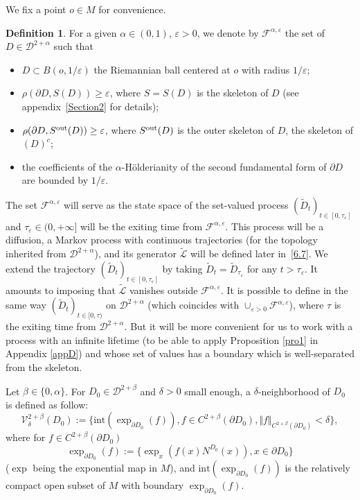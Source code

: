 \documentclass[JEP,XML,SOM,Unicode,NoFloatCountersInSection,published]{cedram}
\let\epsilon\varepsilon
\theoremstyle{plain}
\theoremstyle{definition}
\newtheorem{definition}[thm]{Definition}
\newcommand{\SD}{{\mathscr D}}
\newcommand{\SL}{{\mathscr L}}
\newcommand{\barD}{D}
\newcommand{\inte}{\mathrm{int}}
\let\a\alpha
\let\b\beta
\let\d\delta
\let\e\varepsilon
\let\pa\partial
\let\wi\widetilde
\let\iy\infty
\newcommand{\cD}{\mathcal{D}}
\newcommand{\cF}{\mathcal{F}}
\begin{document}
We fix a point $o\in M$ for convenience.
\begin{definition}
\label{D6.1}
For a given $\a\in(0,1)$, $\e>0$,
we denote by $\cF^{\alpha,\e}$ the set of $D\in \SD^{2+\a}$ such that
\begin{itemize}
\item $D\subset B(o,1/\e)$ the Riemannian ball centered at $o$ with radius $1/\e$;
\item $\rho(\partial D, S(D))\geq \e$,
where $S=S(D)$ is the skeleton of $D$ (see appendix~\ref{Section2} for details);
\item $\rho(\partial D, S^{\rm out}(D))\geq \e$,
where $S^{\rm out}(D)$ is the outer skeleton of $D$, \ie the skeleton of $(\barD )^c$;
\item the coefficients of the $\alpha$-Hölderianity of the second fundamental form of $\pa D$ are bounded by $1/\epsilon$.
\end{itemize}
The set $\cF^{\alpha,\e}$ will serve as the state space of the set-valued process $(\wi D_t)_{t\in[0,{\tau_{\e}}]}$
and ${\tau_{\e}}\in(0,+\iy]$ will be the exiting time from $\cF^{\alpha,\e}$.
This process will be a diffusion, \ie a Markov process with continuous trajectories (for the topology inherited from $\SD^{2+\a}$),
and its generator $\wi \SL$ will be defined later in~\eqref{6.7}.
We extend the trajectory $(\wi D_t)_{t\in[0,{\tau_{\e}}]}$ by taking $\wi D_t=\wi D_{\tau_{\e}}$ for any $t> {\tau_{\e}}$.
It amounts to imposing that $\wi \SL$ vanishes outside $\cF^{\alpha,\e}$.
It is possible to define in the same way $(\wi D_t)_{t\in[0,{\tau})}$ on $\cD^{2+\a}$ (which coincides with $\cup_{\e>0}\cF^{\a,\e}$), where $\tau$ is the exiting time from $\cD^{2+\a}$.
But it will be more convenient for us to work with a process with an infinite lifetime (to be able to apply Proposition \ref{pro1} in Appendix \ref{appD}) and whose set of values has a boundary which is well-separated from the skeleton.
\end{definition}

Let $\b\in \{0,\a\}$.
For $D_0 \in \cD^{2+\b}$ and $\d>0$ small enough, a $\d$-neighborhood of $D_0$ is defined as follow:
\begin{equation}
\label{fV}
\mathcal{V}_\d^{2+\b}(D_0):= \bigl\{\inte(\exp_{\partial D_0} (f)), f \in C^{2+ \b} (\partial D_0), \Vert f \Vert_{C^{2 +\b}(\partial D_0)} < \d \bigr\},
\end{equation}
where for $f \in C^{2+ \b} (\partial D_0)$
\[
\exp_{\partial D_0} (f):= \bigl\{\exp_{x}(f(x)N^{D_0}(x)), x \in \partial D_0 \bigr\}
\]
($\exp$ being the exponential map in $M$),
and $\inte(\exp_{\partial D_0}(f))$ is the relatively compact open subset of $M$ with boundary $\exp_{\partial D_0}(f)$.
\end{document}
